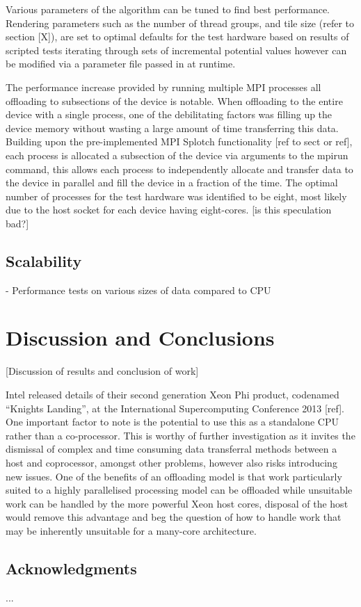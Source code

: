 \documentclass{easychair}
\begin{document}
Various parameters of the algorithm can be tuned to find best performance. Rendering parameters such as the number of 
thread groups, and tile size (refer to section [X]), are set to optimal defaults for the test hardware based on results 
of scripted tests iterating through sets of incremental potential values however can be modified via a parameter file 
passed in at runtime.

The performance increase provided by running multiple MPI processes all offloading to subsections of the device is 
notable. When offloading to the entire device with a single process, one of the debilitating factors was filling up 
the device memory without wasting a large amount of time transferring this data. Building upon the pre-implemented MPI 
Splotch functionality [ref to sect or ref], each process is allocated a subsection of the device via arguments to the 
mpirun command, this  allows each process to independently allocate and transfer data to the device in parallel and 
fill the device in a fraction of the time. The optimal number of processes for the test hardware was identified to be 
eight, most likely due to the host socket for each device having eight-cores. [is this speculation bad?] 

\subsection{Scalability}
\label{sect:scalability}

\noindent
- Performance tests on various sizes of data compared to CPU

\section{Discussion and Conclusions}
\label{sect:conclusions}

[Discussion of results and conclusion of work]

Intel released details of their second generation Xeon Phi product, codenamed “Knights Landing”,  at the International 
Supercomputing Conference 2013 [ref]. One important factor to note is the potential to use this as a standalone CPU 
rather than a co-processor. This is worthy of further investigation as it invites the dismissal of complex and time 
consuming data transferral methods between a host and coprocessor, amongst other problems, however also risks 
introducing new issues. One of the benefits of an offloading model is that work particularly suited to a highly 
parallelised processing model can be offloaded while unsuitable work can be handled by the more powerful Xeon host 
cores, disposal of the host would remove this advantage and beg the question of how to handle work that may be 
inherently unsuitable for a many-core architecture.
 

\subsection{Acknowledgments}
\label{sect:acks}

...

\end{document}
